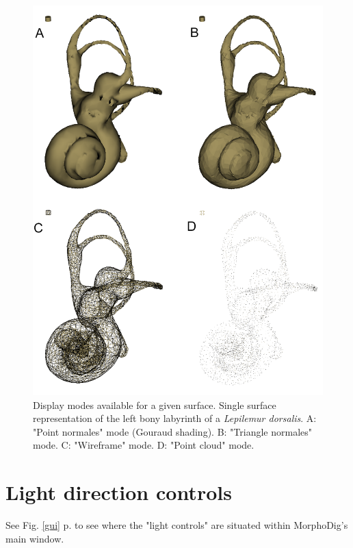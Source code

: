 \begin{figure}
  \centering
  \includegraphics[scale=0.4]{images/06/display/4display_modes.png} 
	\caption{Display modes available for a given surface. Single surface representation of the left bony labyrinth of a  \textit{Lepilemur dorsalis}. A: "Point normales" mode (Gouraud shading). B: "Triangle normales" mode. C: "Wireframe" mode. D: "Point cloud" mode.}
\label{4display_modes}
 
\end{figure}


\section{Light direction controls}
See Fig. \ref{gui} p.\pageref{gui} to see where the "light controls" are situated within MorphoDig's main window.


